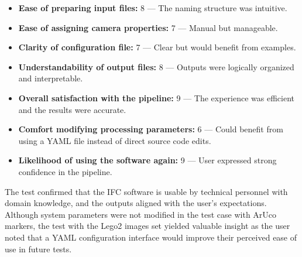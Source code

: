 \documentclass[12pt, titlepage]{article}
\begin{document}
\begin{itemize}
  \item \textbf{Ease of preparing input files:} 8 — The naming structure was intuitive.
  \item \textbf{Ease of assigning camera properties:} 7 — Manual but manageable.
  \item \textbf{Clarity of configuration file:} 7 — Clear but would benefit from examples.
  \item \textbf{Understandability of output files:} 8 — Outputs were logically organized and interpretable.
  \item \textbf{Overall satisfaction with the pipeline:} 9 — The experience was efficient and the results were accurate.
  \item \textbf{Comfort modifying processing parameters:} 6 — Could benefit from using a YAML file instead of direct source code edits.
  \item \textbf{Likelihood of using the software again:} 9 — User expressed strong confidence in the pipeline.
\end{itemize}
The test confirmed that the IFC software is usable by technical personnel with domain knowledge, and the outputs aligned with the user’s expectations. Although system parameters were not modified in the test case with ArUco markers, the test with the Lego2 images set yielded valuable insight as the user noted that a YAML configuration interface would improve their perceived ease of use in future tests.\\
\end{document}
